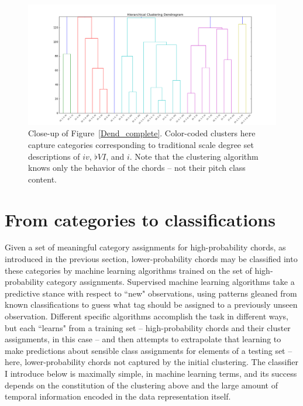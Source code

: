 \begin{figure}
	\centering
	\includegraphics[width=6in]{Dend_iv_bVI_i.png}
	\caption{Close-up of Figure~\ref{Dend_complete}.  Color-coded clusters here capture categories corresponding to traditional scale degree set descriptions of $iv$, $\flat VI$, and $i$.  Note that the clustering algorithm knows only the behavior of the chords -- not their pitch class content.}
	\label{Dend_sub3}
\end{figure}

\section{From categories to classifications}
Given a set of meaningful category assignments for high-probability chords, as introduced in the previous section, lower-probability chords may be classified into these categories by machine learning algorithms trained on the set of high-probability category assignments.  Supervised machine learning algorithms take a predictive stance with respect to ``new" observations, using patterns gleaned from known classifications to guess what tag should be assigned to a previously unseen observation.  Different specific algorithms accomplish the task in different ways, but each ``learns" from a training set -- high-probability chords and their cluster assignments, in this case -- and then attempts to extrapolate that learning to make predictions about sensible class assignments for elements of a testing set -- here, lower-probability chords not captured by the initial clustering.  The classifier I introduce below is maximally simple, in machine learning terms, and its success depends on the constitution of the clustering above and the large amount of temporal information encoded in the data representation itself.

